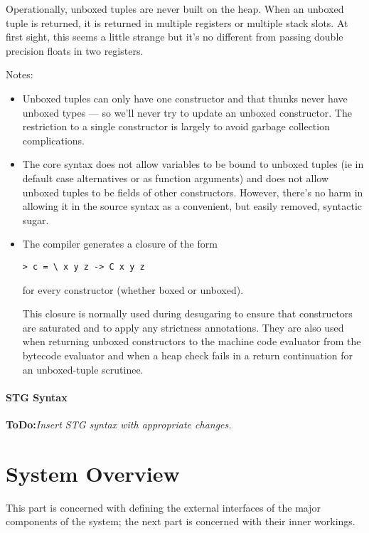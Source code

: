 \documentclass[11pt]{article}
\newcommand{\ToDo}[1]{{{\bf ToDo:}\sl #1}}
\newcommand{\Subsection}[2]{\subsection{#1}\label{sec:#2}}
\begin{document}
Operationally, unboxed tuples are never built on the heap.  When
an unboxed tuple is returned, it is returned in multiple registers
or multiple stack slots.  At first sight, this seems a little strange
but it's no different from passing double precision floats in two
registers.

Notes:
\begin{itemize}
\item
Unboxed tuples can only have one constructor and that
thunks never have unboxed types --- so we'll never try to update an
unboxed constructor.  The restriction to a single constructor is
largely to avoid garbage collection complications.

\item
The core syntax does not allow variables to be bound to
unboxed tuples (ie in default case alternatives or as function arguments)
and does not allow unboxed tuples to be fields of other constructors.
However, there's no harm in allowing it in the source syntax as a
convenient, but easily removed, syntactic sugar.

\item
The compiler generates a closure of the form
\begin{verbatim}
> c = \ x y z -> C x y z
\end{verbatim}
for every constructor (whether boxed or unboxed).  

This closure is normally used during desugaring to ensure that
constructors are saturated and to apply any strictness annotations.
They are also used when returning unboxed constructors to the machine
code evaluator from the bytecode evaluator and when a heap check fails
in a return continuation for an unboxed-tuple scrutinee.

\end{itemize}

\Subsection{STG Syntax}{stg-syntax}


\ToDo{Insert STG syntax with appropriate changes.}


\part{System Overview}

This part is concerned with defining the external interfaces of the
major components of the system; the next part is concerned with their
inner workings.
\end{document}
